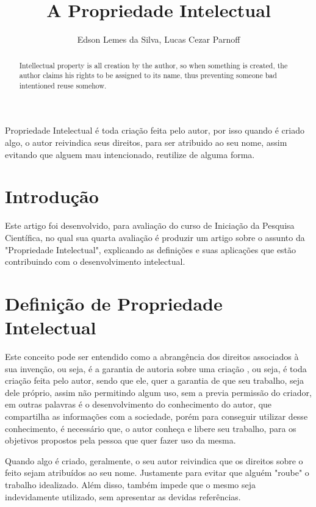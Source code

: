 \documentclass[12pt]{article}
\title{A Propriedade Intelectual}
\author{Edson Lemes da Silva\inst{1}, Lucas Cezar Parnoff\inst{1}  }
\begin{document}
 

\maketitle

\begin{abstract}
  Intellectual property is all creation by the author, so when something is created, the author claims his rights to be assigned to its name, thus preventing someone bad intentioned reuse somehow.
\end{abstract}
     
\begin{resumo} 
  Propriedade Intelectual é toda criação feita pelo autor, por isso quando é criado algo, o autor reivindica seus direitos, para ser atribuido ao seu nome, assim evitando que alguem mau intencionado, reutilize de alguma forma. 
\end{resumo}

\section{Introdução}\label{sec:introducao}

Este artigo foi desenvolvido, para avaliação
do curso de Iniciação da Pesquisa Científica, no qual
sua quarta avaliação é produzir um artigo sobre o assunto da
"Propriedade Intelectual", explicando as definições e
suas aplicações que estão contribuindo com
o desenvolvimento intelectual.

\section{Definição de Propriedade Intelectual}\label{sec:conteudo}

Este conceito pode ser entendido como a abrangência  dos direitos associados à sua invenção, ou seja, é a garantia de autoria sobre uma criação \cite{UFAL}, ou seja, é toda criação feita pelo autor, sendo que ele, quer a garantia de que seu trabalho, seja dele próprio, assim não permitindo algum uso, sem a previa permissão do criador, em outras palavras é o desenvolvimento do conhecimento do autor, que compartilha as informações com a sociedade, porém para conseguir utilizar desse conhecimento, é necessário que, o autor conheça e libere seu trabalho, para os objetivos propostos pela pessoa que quer fazer uso da mesma. 

Quando algo é criado, geralmente, o seu autor reivindica que os direitos sobre o feito sejam atribuídos ao seu nome. Justamente para evitar que alguém "roube" o trabalho idealizado. Além disso, também impede que o mesmo seja indevidamente utilizado, sem apresentar as devidas referências.
\end{document}
